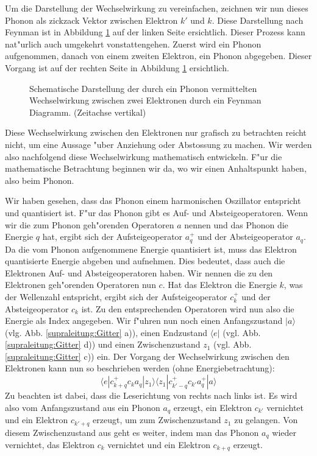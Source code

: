 \begin{refsection}
Um die Darstellung der Wechselwirkung zu vereinfachen, zeichnen wir nun dieses Phonon
als zickzack Vektor zwischen Elektron $k'$ und $k$. Diese Darstellung nach Feynman
ist in Abbildung \ref{supraleitung:FeynmanDiagram1} auf der linken Seite ersichtlich.
Dieser Prozess kann nat"urlich auch umgekehrt vonstattengehen.
Zuerst wird ein Phonon aufgenommen, danach von einem zweiten Elektron, ein Phonon abgegeben.
Dieser Vorgang ist auf der rechten Seite in Abbildung \ref{supraleitung:FeynmanDiagram1} ersichtlich.

\begin{figure} %
\centering

\caption{Schematische Darstellung der durch ein Phonon vermittelten
Wechselwirkung zwischen zwei Elektronen durch ein Feynman Diagramm.
\cite{supraleitung:feynman}
(Zeitachse vertikal)
\label{supraleitung:FeynmanDiagram1}}
\end{figure}

Diese Wechselwirkung zwischen den Elektronen nur grafisch zu betrachten reicht nicht,
um eine Aussage "uber Anziehung oder Abstossung zu machen.
Wir werden also nachfolgend diese Wechselwirkung mathematisch entwickeln.
F"ur die mathematische Betrachtung beginnen wir da, wo wir einen Anhaltspunkt haben, also beim Phonon.

Wir haben gesehen, dass das Phonon einem harmonischen Oszillator entspricht und quantisiert ist.
F"ur das Phonon gibt es Auf- und Absteigeoperatoren.
Wenn wir die zum Phonon geh"orenden Operatoren $a$ nennen und das Phonon die Energie $q$ hat,
ergibt sich der Aufsteigeoperator
$a^+_q$ und der Absteigeoperator $a_q$.
Da die vom Phonon aufgenommene Energie quantisiert ist, muss das Elektron quantisierte Energie
abgeben und aufnehmen.
Dies bedeutet, dass auch die Elektronen Auf- und Absteigeoperatoren haben.
Wir nennen die zu den Elektronen geh"orenden Operatoren nun $c$. Hat das Elektron die Energie $k$,
was der Wellenzahl entspricht, ergibt sich der Aufsteigeoperator $c^+_k$ und der
Absteigeoperator $c_k$ ist.
Zu den entsprechenden Operatoren wird nun also die Energie als Index angegeben.
Wir f"uhren nun noch einen Anfangszustand $|a\rangle$ (vlg. Abb. \ref{supraleitung:Gitter} a)),
einen Endzustand $\langle e|$ (vgl. Abb. \ref{supraleitung:Gitter} d)) und
einen Zwischenzustand $z_1$ (vgl. Abb. \ref{supraleitung:Gitter} c)) ein.
Der Vorgang der Wechselwirkung zwischen den Elektronen kann nun so beschrieben werden
(ohne Energiebetrachtung):
\begin{equation}
\langle e|c^+_{k+q} c_k a_q |z_1\rangle\langle z_1| c^+_{k'-q} c_{k'} a^+_q |a\rangle
\label{supraleitung:WechselwirkungOE}
\end{equation}
Zu beachten ist dabei, dass die Leserichtung von rechts nach links ist.
Es wird also vom Anfangszustand aus ein Phonon $a_q$ erzeugt, ein Elektron $c_{k'}$ vernichtet
und ein Elektron $c_{k'+q}$ erzeugt, um zum Zwischenzustand $z_1$ zu gelangen.
Von diesem Zwischenzustand aus geht es weiter, indem man das Phonon $a_q$ wieder vernichtet,
das Elektron $c_k$ vernichtet und ein Elektron $c_{k+q}$ erzeugt.


\end{refsection}
